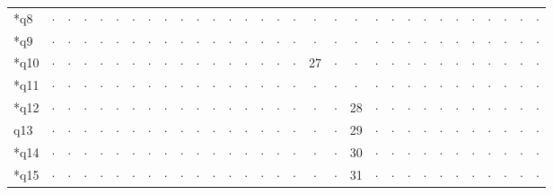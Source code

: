 \begin{longtable}{l|cccccccccccccccccccccccccccccc}
*q8 & $\cdot$ & $\cdot$ & $\cdot$ & $\cdot$ & $\cdot$ & $\cdot$ & $\cdot$ & $\cdot$ & $\cdot$ & $\cdot$ & $\cdot$ & $\cdot$ & $\cdot$ & $\cdot$ & $\cdot$ & $\cdot$ & $\cdot$ & $\cdot$ & $\cdot$ & $\cdot$ & $\cdot$ & $\cdot$ & $\cdot$ & $\cdot$ & $\cdot$ & $\cdot$ & $\cdot$ & $\cdot$ & $\cdot$ & $\cdot$ \\
*q9 & $\cdot$ & $\cdot$ & $\cdot$ & $\cdot$ & $\cdot$ & $\cdot$ & $\cdot$ & $\cdot$ & $\cdot$ & $\cdot$ & $\cdot$ & $\cdot$ & $\cdot$ & $\cdot$ & $\cdot$ & $\cdot$ & $\cdot$ & $\cdot$ & $\cdot$ & $\cdot$ & $\cdot$ & $\cdot$ & $\cdot$ & $\cdot$ & $\cdot$ & $\cdot$ & $\cdot$ & $\cdot$ & $\cdot$ & $\cdot$ \\
*q10 & $\cdot$ & $\cdot$ & $\cdot$ & $\cdot$ & $\cdot$ & $\cdot$ & $\cdot$ & $\cdot$ & $\cdot$ & $\cdot$ & $\cdot$ & $\cdot$ & $\cdot$ & $\cdot$ & $\cdot$ & $\cdot$ & 27 & $\cdot$ & $\cdot$ & $\cdot$ & $\cdot$ & $\cdot$ & $\cdot$ & $\cdot$ & $\cdot$ & $\cdot$ & $\cdot$ & $\cdot$ & $\cdot$ & $\cdot$ \\
*q11 & $\cdot$ & $\cdot$ & $\cdot$ & $\cdot$ & $\cdot$ & $\cdot$ & $\cdot$ & $\cdot$ & $\cdot$ & $\cdot$ & $\cdot$ & $\cdot$ & $\cdot$ & $\cdot$ & $\cdot$ & $\cdot$ & $\cdot$ & $\cdot$ & $\cdot$ & $\cdot$ & $\cdot$ & $\cdot$ & $\cdot$ & $\cdot$ & $\cdot$ & $\cdot$ & $\cdot$ & $\cdot$ & $\cdot$ & $\cdot$ \\
*q12 & $\cdot$ & $\cdot$ & $\cdot$ & $\cdot$ & $\cdot$ & $\cdot$ & $\cdot$ & $\cdot$ & $\cdot$ & $\cdot$ & $\cdot$ & $\cdot$ & $\cdot$ & $\cdot$ & $\cdot$ & $\cdot$ & $\cdot$ & $\cdot$ & 28 & $\cdot$ & $\cdot$ & $\cdot$ & $\cdot$ & $\cdot$ & $\cdot$ & $\cdot$ & $\cdot$ & $\cdot$ & $\cdot$ & $\cdot$ \\
q13 & $\cdot$ & $\cdot$ & $\cdot$ & $\cdot$ & $\cdot$ & $\cdot$ & $\cdot$ & $\cdot$ & $\cdot$ & $\cdot$ & $\cdot$ & $\cdot$ & $\cdot$ & $\cdot$ & $\cdot$ & $\cdot$ & $\cdot$ & $\cdot$ & 29 & $\cdot$ & $\cdot$ & $\cdot$ & $\cdot$ & $\cdot$ & $\cdot$ & $\cdot$ & $\cdot$ & $\cdot$ & $\cdot$ & $\cdot$ \\
*q14 & $\cdot$ & $\cdot$ & $\cdot$ & $\cdot$ & $\cdot$ & $\cdot$ & $\cdot$ & $\cdot$ & $\cdot$ & $\cdot$ & $\cdot$ & $\cdot$ & $\cdot$ & $\cdot$ & $\cdot$ & $\cdot$ & $\cdot$ & $\cdot$ & 30 & $\cdot$ & $\cdot$ & $\cdot$ & $\cdot$ & $\cdot$ & $\cdot$ & $\cdot$ & $\cdot$ & $\cdot$ & $\cdot$ & $\cdot$ \\
*q15 & $\cdot$ & $\cdot$ & $\cdot$ & $\cdot$ & $\cdot$ & $\cdot$ & $\cdot$ & $\cdot$ & $\cdot$ & $\cdot$ & $\cdot$ & $\cdot$ & $\cdot$ & $\cdot$ & $\cdot$ & $\cdot$ & $\cdot$ & $\cdot$ & 31 & $\cdot$ & $\cdot$ & $\cdot$ & $\cdot$ & $\cdot$ & $\cdot$ & $\cdot$ & $\cdot$ & $\cdot$ & $\cdot$ & $\cdot$ \\

\end{longtable}
